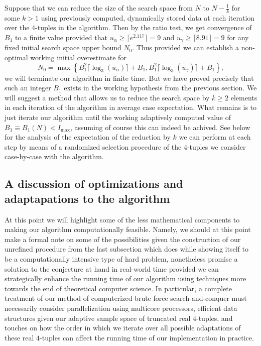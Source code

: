 \documentclass[12pt]{article}
\begin{document}
Suppose that we can reduce the size of the search space from $N$ to $N-\frac{1}{k}$ for some $k > 1$ 
using previously computed, dynamically stored data at each iteration over the $4$-tuples in the 
algorithm. Then by the ratio test, we get convergence of $B_1$ to a finite value provided that 
$u_{\alpha} \geq \lceil e^{2.117} \rceil = 9$ and $u_{\gamma} \geq \lceil 8.91 \rceil = 9$ 
for any fixed initial search space upper bound $N_0$. Thus provided we can establish a non-optimal 
working initial overestimate for 
$$N_0 = \max\left\{B_1^2 \lceil \log_3(u_{\alpha})\rceil+B_1, 
     B_1^2 \lceil \log_3(u_{\gamma})\rceil+B_1\right\},$$ 
we will terminate 
our algorithm in finite time. But we have proved precisely that such an integer $B_1$ exists in the 
working hypothesis from the previous section. We will suggest a method that allows us to reduce the 
search space by $k \geq 2$ elements in each iteration of the algorithm in average case expectation. 
What remains is to just iterate our algorithm until the working adaptively computed value of 
$B_1 \equiv B_1(N) < I_{\max}$, assuming of course this can indeed be achived. 
See below for the analysis of the 
expectation of the reduction by $k$ we can perform at each step by means of a randomized selection 
procedure of the $4$-tuples we consider case-by-case with the algorithm. 

\subsection{A discussion of optimizations and adaptapations to the algorithm} 

At this point we will highlight some of the less mathematical components to making our algorithm 
computationally feasible. Namely, we should at this point make a formal note on some of the 
possibilities given the construction of our unrefined procedure from the last subsection which does 
while showing itself to be a computationally intensive type of hard problem, nonetheless promise a solution 
to the conjecture at hand in real-world time provided we can strategically enhance the running time of 
our algorithm using techniques more towards the end of theoretical computer science. 
In particular, a complete treatment of our method of computerized brute force search-and-conquer 
must necessarily consider parallelization using multicore processors, efficient data structures given 
our adaptive sample space of truncated real $4$-tuples, and touches on how the order in which we 
iterate over all possible adaptations of these real $4$-tuples can affect the running time of our 
implementation in practice. 
\end{document}
